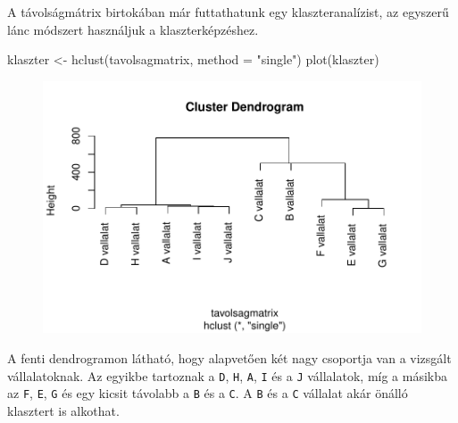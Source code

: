 \documentclass[
  letterpaper,
]{krantz}
\makeatletter
\newenvironment{Shaded}{\begin{snugshade}}{\end{snugshade}}
\newcommand{\AttributeTok}[1]{\textcolor[rgb]{0.40,0.45,0.13}{#1}}
\newcommand{\FunctionTok}[1]{\textcolor[rgb]{0.28,0.35,0.67}{#1}}
\newcommand{\NormalTok}[1]{\textcolor[rgb]{0.00,0.23,0.31}{#1}}
\newcommand{\OtherTok}[1]{\textcolor[rgb]{0.00,0.23,0.31}{#1}}
\newcommand{\StringTok}[1]{\textcolor[rgb]{0.13,0.47,0.30}{#1}}
\newenvironment{kframe}{%
\medskip{}
\setlength{\fboxsep}{.8em}
 \def\at@end@of@kframe{}%
 \ifinner\ifhmode%
  \def\at@end@of@kframe{\end{minipage}}%
  \begin{minipage}{\columnwidth}%
 \fi\fi%
 \def\FrameCommand##1{\hskip\@totalleftmargin \hskip-\fboxsep
 \colorbox{shadecolor}{##1}\hskip-\fboxsep
     \hskip-\linewidth \hskip-\@totalleftmargin \hskip\columnwidth}%
 \MakeFramed {\advance\hsize-\width
   \@totalleftmargin\z@ \linewidth\hsize
   \@setminipage}}%
 {\par\unskip\endMakeFramed%
 \at@end@of@kframe}
\renewenvironment{Shaded}{\begin{kframe}}{\end{kframe}}
\makeatother
\begin{document}
A távolságmátrix birtokában már futtathatunk egy klaszteranalízist, az
egyszerű lánc módszert használjuk a klaszterképzéshez.

\begin{Shaded}
\begin{Highlighting}[]
\NormalTok{klaszter }\OtherTok{\textless{}{-}} \FunctionTok{hclust}\NormalTok{(tavolsagmatrix, }\AttributeTok{method =} \StringTok{"single"}\NormalTok{)}
\FunctionTok{plot}\NormalTok{(klaszter)}
\end{Highlighting}
\end{Shaded}

\begin{figure}[H]

{\centering \includegraphics{./sec_klaszter_files/figure-pdf/unnamed-chunk-14-1.pdf}

}

\end{figure}

A fenti dendrogramon látható, hogy alapvetően két nagy csoportja van a
vizsgált vállalatoknak. Az egyikbe tartoznak a \texttt{D}, \texttt{H},
\texttt{A}, \texttt{I} és a \texttt{J} vállalatok, míg a másikba az
\texttt{F}, \texttt{E}, \texttt{G} és egy kicsit távolabb a \texttt{B}
és a \texttt{C}. A \texttt{B} és a \texttt{C} vállalat akár önálló
klasztert is alkothat.
\end{document}
